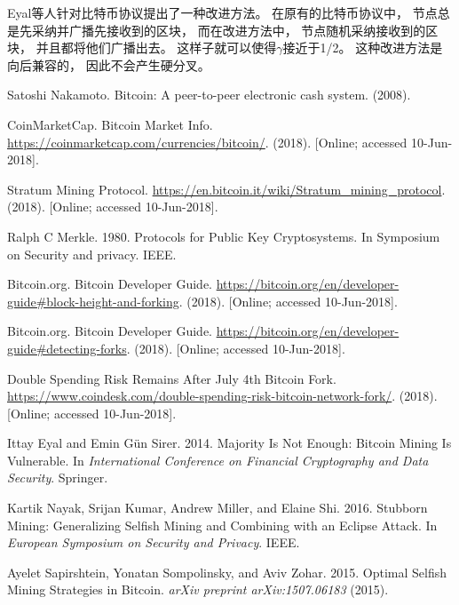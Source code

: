 \documentclass[a4paper, 11pt]{article}
\begin{document}
\begin{CJK*}{UTF8}{gbsn}
    Eyal等人针对比特币协议提出了一种改进方法。
    在原有的比特币协议中，
    节点总是先采纳并广播先接收到的区块，
    而在改进方法中，
    节点随机采纳接收到的区块，
    并且都将他们广播出去。
    这样子就可以使得$\gamma$接近于1/2。
    这种改进方法是向后兼容的，
    因此不会产生硬分叉。

    \clearpage

    \begin{thebibliography}{8}

    Satoshi Nakamoto. Bitcoin: A peer-to-peer electronic cash system. (2008).

    CoinMarketCap. Bitcoin Market Info. 
    \url{https://coinmarketcap.com/currencies/bitcoin/}. 
    (2018). [Online; accessed 10-Jun-2018].


    Stratum Mining Protocol. 
    \url{https://en.bitcoin.it/wiki/Stratum_mining_protocol}.
    (2018). [Online; accessed 10-Jun-2018].
    
    
    Ralph C Merkle. 1980. Protocols for Public Key Cryptosystems. In Symposium on
    Security and privacy. IEEE.

    Bitcoin.org. Bitcoin Developer Guide. 
    \url{https://bitcoin.org/en/developer-guide#block-height-and-forking}.
    (2018). [Online; accessed 10-Jun-2018].


    Bitcoin.org. Bitcoin Developer Guide. 
    \url{https://bitcoin.org/en/developer-guide#detecting-forks}.
    (2018). [Online; accessed 10-Jun-2018].

    Double Spending Risk Remains After July 4th Bitcoin Fork.
    \url{https://www.coindesk.com/double-spending-risk-bitcoin-network-fork/}. 
    (2018). [Online; accessed 10-Jun-2018].

    Ittay Eyal and Emin Gün Sirer. 2014. Majority Is Not Enough: Bitcoin Mining
    Is Vulnerable. 
    In \textit{International Conference on Financial Cryptography and Data
    Security}. Springer.

    Kartik Nayak, Srijan Kumar, Andrew Miller, and Elaine Shi. 2016. Stubborn
    Mining: Generalizing Selfish Mining and Combining with an Eclipse Attack. 
    In \textit{European Symposium on Security and Privacy}. IEEE.

    Ayelet Sapirshtein, Yonatan Sompolinsky, and Aviv Zohar. 2015. Optimal Selfish
    Mining Strategies in Bitcoin.
    \textit{arXiv preprint arXiv:1507.06183} (2015).


\end{thebibliography}
\end{CJK*}
\end{document}
